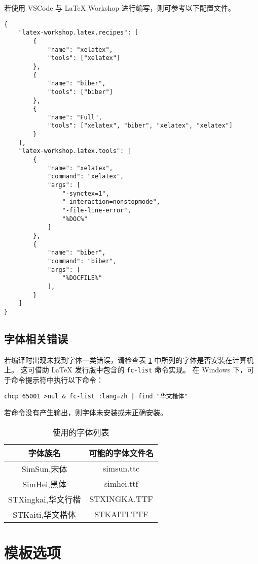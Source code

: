 若使用 VSCode 与 LaTeX Workshop 进行编写，则可参考以下配置文件。
\begin{lstlisting}[caption={LaTeX Workshop 配置}]
{
    "latex-workshop.latex.recipes": [
        {
            "name": "xelatex",
            "tools": ["xelatex"]
        },
        {
            "name": "biber",
            "tools": ["biber"]
        },
        {
            "name": "Full",
            "tools": ["xelatex", "biber", "xelatex", "xelatex"]
        }
    ],
    "latex-workshop.latex.tools": [
        {
            "name": "xelatex",
            "command": "xelatex",
            "args": [
                "-synctex=1",
                "-interaction=nonstopmode",
                "-file-line-error",
                "%DOC%"
            ]
        },
        {
            "name": "biber",
            "command": "biber",
            "args": [
                "%DOCFILE%"
            ],
        }
    ]
}
\end{lstlisting}

\subsection{字体相关错误}

若编译时出现未找到字体一类错误，请检查表 \ref{tab:font-list} 中所列的字体是否安装在计算机上。
这可借助 \LaTeX{} 发行版中包含的 \verb|fc-list| 命令实现。
在 Windows 下，可于命令提示符中执行以下命令：
\begin{lstlisting}[caption={检查字体的批处理命令}]
chcp 65001 >nul & fc-list :lang=zh | find "华文楷体"
\end{lstlisting}
若命令没有产生输出，则字体未安装或未正确安装。

\begin{table}
    \centering
    \caption{使用的字体列表}
    \label{tab:font-list}
    \begin{tabular}{cc}
        \hline 
         字体族名 & 可能的字体文件名 \\ \hline
         SimSun,宋体 & simsun.ttc \\
         SimHei,黑体 & simhei.ttf \\
         STXingkai,华文行楷 & STXINGKA.TTF \\
         STKaiti,华文楷体 & STKAITI.TTF \\ \hline
    \end{tabular}
\end{table}

\section{模板选项}
